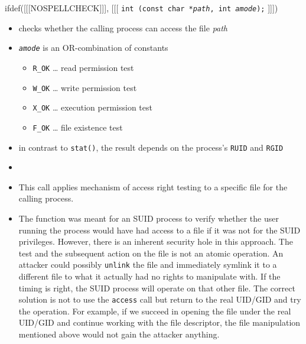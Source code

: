 

\begin{slide}
ifdef([[[NOSPELLCHECK]]], [[[
\texttt{int (const char *\emph{path}, int \emph{amode});}
]]])
\begin{itemize}
\item checks whether the calling process can access the file \emph{path}
\item \emph{\texttt{amode}} is an OR-combination of constants
    \begin{itemize}
    \item \verb#R_OK# \dots{} read permission test
    \item \verb#W_OK# \dots{} write permission test
    \item \verb#X_OK# \dots{} execution permission test
    \item \verb#F_OK# \dots{} file existence test
    \end{itemize}
\item in contrast to \texttt{stat()}, the result depends on the process's
\texttt{RUID} and \texttt{RGID}
\item {}
\end{itemize}
\end{slide}

\begin{itemize}
\item This call applies mechanism of access right testing to a specific file for
the calling process.
\item The function was meant for an SUID process to verify whether the user
running the process would have had access to a file if it was not for the SUID
privileges.  However, there is an inherent security hole in this approach.
The test and the subsequent action on the file is not an atomic operation.  An
attacker could possibly \texttt{unlink} the file and immediately symlink it to a
different file to what it actually had no rights to manipulate with.  If the
timing is right, the SUID process will operate on that other file.  The correct
solution is not to use the \texttt{access} call but return to the real UID/GID
and try the operation.  For example, if we succeed in opening the file under the
real UID/GID and continue working with the file descriptor, the file
manipulation mentioned above would not gain the attacker anything.
\end{itemize}


